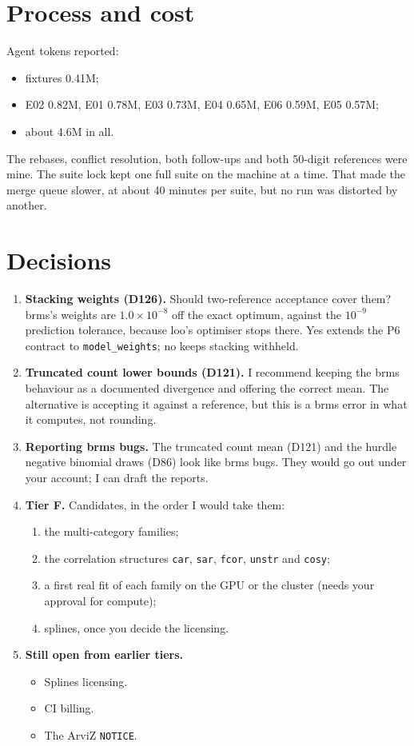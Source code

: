 \documentclass[11pt]{article}
\newcommand{\code}[1]{\texttt{#1}}
\newcommand{\file}[1]{\texttt{#1}}
\begin{document}
\section{Process and cost}

Agent tokens reported:
\begin{itemize}
\item fixtures 0.41M;
\item E02 0.82M, E01 0.78M, E03 0.73M, E04 0.65M, E06 0.59M, E05 0.57M;
\item about 4.6M in all.
\end{itemize}
The rebases, conflict resolution, both follow-ups and both 50-digit references were mine. The suite lock kept one full
suite on the machine at a time. That made the merge queue slower, at about 40 minutes per suite, but no run was
distorted by another.

\section{Decisions}
\label{sec:decisions}

\begin{enumerate}
\item \textbf{Stacking weights (D126).} Should two-reference acceptance cover them? brms's weights are $1.0\times10^{-8}$
  off the exact optimum, against the $10^{-9}$ prediction tolerance, because loo's optimiser stops there. Yes extends the P6
  contract to \code{model\_weights}; no keeps stacking withheld.
\item \textbf{Truncated count lower bounds (D121).} I recommend keeping the brms behaviour as a documented divergence and
  offering the correct mean. The alternative is accepting it against a reference, but this is a brms error in what it
  computes, not rounding.
\item \textbf{Reporting brms bugs.} The truncated count mean (D121) and the hurdle negative binomial draws (D86) look like
  brms bugs. They would go out under your account; I can draft the reports.
\item \textbf{Tier F.} Candidates, in the order I would take them:
  \begin{enumerate}
  \item[(a)] the multi-category families;
  \item[(b)] the correlation structures \code{car}, \code{sar}, \code{fcor}, \code{unstr} and \code{cosy};
  \item[(c)] a first real fit of each family on the GPU or the cluster (needs your approval for compute);
  \item[(d)] splines, once you decide the licensing.
  \end{enumerate}
\item \textbf{Still open from earlier tiers.}
  \begin{itemize}
  \item Splines licensing.
  \item CI billing.
  \item The ArviZ \file{NOTICE}.
  \end{itemize}
\end{enumerate}
\end{document}
